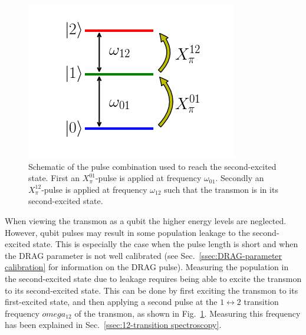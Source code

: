         \begin{figure}
          \begin{center}
          \vspace{-30pt}
            \includegraphics[width=\textwidth]{Figures/Exploring frequency re-use/schematic second transition pulsing.png}
          \end{center}
          \vspace{-20 pt}
          \caption{Schematic of the pulse combination used to reach the second-excited state. First an $X_\pi^{01}$-pulse is applied at frequency $\omega_{01}$. Secondly an $X_\pi^{12}$-pulse is applied at frequency $\omega_{12}$ such that the transmon is in its second-excited state.}
          \label{fig:schematic pulsing to second-excited state}
        \end{figure}

        When viewing the transmon as a qubit the higher energy levels are neglected. However, qubit pulses may result in some population leakage to the second-excited state. This is especially the case when the pulse length is short and when the DRAG parameter is not well calibrated (see Sec.~\ref{ssec:DRAG-parameter calibration} for information on the DRAG pulse). Measuring the population in the second-excited state due to leakage requires being able to excite the transmon to its second-excited state. This can be done by first exciting the transmon to its first-excited state, and then applying a second pulse at the $1 \leftrightarrow 2$ transition frequency $omega_{12}$ of the transmon, as shown in Fig.~\ref{fig:schematic pulsing to second-excited state}. Measuring this frequency has been explained in Sec.~\ref{ssec:12-transition spectroscopy}.

